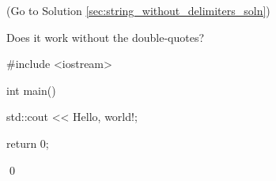 (Go to Solution \ref{sec:string_without_delimiters_soln})

Does it work without the double-quotes?

\begin{console}

#include <iostream>



int main()

{

    std::cout << Hello, world!\n;



    return 0;

}

\end{console}

\qed

